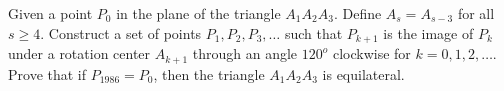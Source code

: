 Given a point $P_0$ in the plane of the triangle $A_1A_2A_3$. Define  $A_s=A_{s-3}$ for all $s\ge4$. Construct a set of points $P_1,P_2,P_3,\ldots$ such that $P_{k+1}$ is the image of $P_k$ under a rotation center $A_{k+1}$ through an angle $120^o$ clockwise for $k=0,1,2,\ldots$. Prove that if $P_{1986}=P_0$,  then the triangle $A_1A_2A_3$ is equilateral.